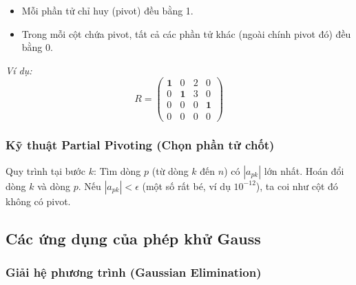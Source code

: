 \documentclass[12pt,a4paper]{article}
\begin{document}
\begin{itemize}
    \item Mỗi phần tử chỉ huy (pivot) đều bằng 1.
    \item Trong mỗi cột chứa pivot, tất cả các phần tử khác (ngoài chính pivot đó) đều bằng 0.
\end{itemize}

\textit{Ví dụ:}
\[
R = \begin{pmatrix}
\mathbf{1} & 0 & 2 & 0 \\
0 & \mathbf{1} & 3 & 0 \\
0 & 0 & 0 & \mathbf{1} \\
0 & 0 & 0 & 0
\end{pmatrix}
\]

\subsubsection{Kỹ thuật Partial Pivoting (Chọn phần tử chốt)}
Quy trình tại bước $k$: Tìm dòng $p$ (từ dòng $k$ đến $n$) có $|a_{pk}|$ lớn nhất. Hoán đổi dòng $k$ và dòng $p$. Nếu $|a_{pk}| < \epsilon$ (một số rất bé, ví dụ $10^{-12}$), ta coi như cột đó không có pivot.

\subsection{Các ứng dụng của phép khử Gauss}
\subsubsection{Giải hệ phương trình (Gaussian Elimination)}
\end{document}
